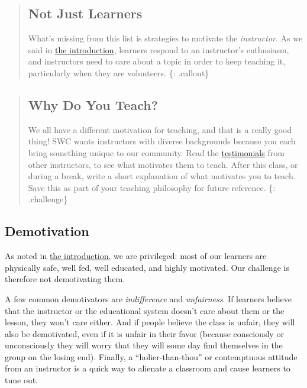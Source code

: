 \begin{quote}
\subsection{Not Just Learners}\label{not-just-learners}

What's missing from this list is strategies to motivate the
\emph{instructor}. As we said in
\href{\{\{\%20page.root\%20\}\}/02-introduction/}{the introduction},
learners respond to an instructor's enthusiasm, and instructors need to
care about a topic in order to keep teaching it, particularly when they
are volunteers. \{: .callout\}
\end{quote}

\begin{quote}
\subsection{Why Do You Teach?}\label{why-do-you-teach}

We all have a different motivation for teaching, and that is a really
good thing! SWC wants instructors with diverse backgrounds because you
each bring something unique to our community. Read the
\href{\{\{\%20page.root\%20\}\}/guide/\#testimonials}{testimonials} from
other instructors, to see what motivates them to teach. After this
class, or during a break, write a short explanation of what motivates
you to teach. Save this as part of your teaching philosophy for future
reference. \{: .challenge\}
\end{quote}

\subsection{Demotivation}\label{demotivation}

As noted in \href{\{\{\%20page.root\%20\}\}/02-introduction/}{the
introduction}, we are privileged: most of our learners are physically
safe, well fed, well educated, and highly motivated. Our challenge is
therefore not demotivating them.

A few common demotivators are \emph{indifference} and \emph{unfairness}.
If learners believe that the instructor or the educational system
doesn't care about them or the lesson, they won't care either. And if
people believe the class is unfair, they will also be demotivated, even
if it is unfair in their favor (because consciously or unconsciously
they will worry that they will some day find themselves in the group on
the losing end). Finally, a ``holier-than-thou'' or contemptuous
attitude from an instructor is a quick way to alienate a classroom and
cause learners to tune out.

